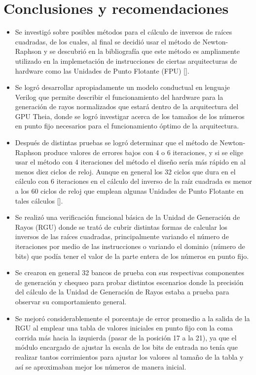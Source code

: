 \chapter{Conclusiones y recomendaciones}

\begin{itemize}

\item Se investigó sobre posibles métodos para el cálculo de inversos de raíces cuadradas, de los cuales, al final se decidió usar el método de Newton-Raphson y se descubrió  en la bibliografía que este método es ampliamente utilizado en la implemetación de instrucciones de ciertas arquitecturas de hardware como las Unidades de Punto Flotante (FPU) [\cite{Soderquist1997}].

\item Se logró desarrollar apropiadamente un modelo conductual en lenguaje Verilog que permite describir el funcionamiento del hardware para la generación de rayos normalizados que estará dentro de la arquitectura del GPU Theia, donde se logró investigar acerca de los tamaños de los números en punto fijo necesarios para el funcionamiento óptimo de la arquitectura.

\item Después de distintas pruebas se logró determinar que el método de Newton-Raphson produce valores de errores bajos con 4 o 6 iteraciones, y si se elige usar el método con 4 iteraciones del método el diseño sería más rápido en al menos diez ciclos de reloj. Aunque en general los 32 ciclos que dura en el cálculo con 6 iteraciones en el cálculo del inverso de la raíz cuadrada es menor a los 60 ciclos de reloj que emplean algunas Unidades de Punto Flotante en tales cálculos [\cite{Soderquist1997}]. 

\item Se realizó una verificación funcional básica de la Unidad de Generación de Rayos (RGU) donde se trató de cubrir distintas formas de calcular los inversos de las raíces cuadradas, principalmente variando el número de iteraciones por medio de las instrucciones o variando el dominio (número de bits) que podía tener el valor de la parte entera de los números en punto fijo.

\item Se crearon en general 32 bancos de prueba con sus respectivas componentes de generación y chequeo para probar distintos escenarios donde la precisión del cálculo de la Unidad de Generación de Rayos estaba a prueba para observar su comportamiento general.  

\item Se mejoró considerablemente el porcentaje de error promedio a la salida de la RGU al emplear una tabla de valores iniciales en punto fijo con la coma corrida más hacia la izquierda (pasar de la posición 17 a la 21), ya que el módulo encargado de ajustar la escala de los bits de entrada no tenía que realizar tantos corrimientos para ajustar los valores al tamaño de la tabla y así se aproximaban mejor los números de manera inicial. 

\end{itemize}

